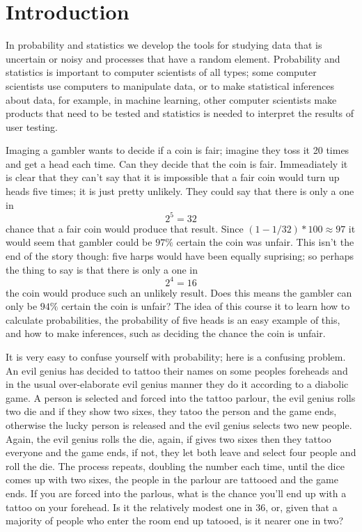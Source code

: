 \documentclass[11pt,a4paper]{scrartcl}
\begin{document}
\section*{Introduction}

In probability and statistics we develop the tools for studying data
that is uncertain or noisy and processes that have a random
element. Probability and statistics is important to computer
scientists of all types; some computer scientists use computers to
manipulate data, or to make statistical inferences about data, for
example, in machine learning, other computer scientists make products
that need to be tested and statistics is needed to interpret the
results of user testing.

Imaging a gambler wants to decide if a coin is fair; imagine they toss
it 20 times and get a head each time. Can they decide that the coin is
fair. Immeadiately it is clear that they can't say that it is
impossible that a fair coin would turn up heads five times; it is just
pretty unlikely. They could say that there is only a one in
\begin{equation}
2^{5}=32
\end{equation}
chance that a fair coin would produce that result. Since
$(1-1/32)*100\approx 97$ it would seem that gambler could be $97\%$
certain the coin was unfair. This isn't the end of the story though:
five harps would have been equally suprising; so perhaps the thing to
say is that there is only a one in
\begin{equation}
2^{4}=16
\end{equation}
the coin would produce such an unlikely result. Does this means the
gambler can only be $94\%$ certain the coin is unfair? The idea of
this course it to learn how to calculate probabilities, the
probability of five heads is an easy example of this, and how to make
inferences, such as deciding the chance the coin is unfair.


It is very easy to confuse yourself with probability; here is a
confusing problem. An evil genius has decided to tattoo their names on
some peoples foreheads and in the usual over-elaborate evil genius
manner they do it according to a diabolic game. A person is selected
and forced into the tattoo parlour, the evil genius rolls two die and
if they show two sixes, they tatoo the person and the game ends,
otherwise the lucky person is released and the evil genius selects two
new people. Again, the evil genius rolls the die, again, if gives two
sixes then they tattoo everyone and the game ends, if not, they let
both leave and select four people and roll the die. The process
repeats, doubling the number each time, until the dice comes up with
two sixes, the people in the parlour are tattooed and the game ends. If you are
forced into the parlous, what is the chance you'll end up with a tattoo
on your forehead. Is it the relatively modest one in 36, or, given
that a majority of people who enter the room end up tatooed, is it
nearer one in two?
\end{document}
